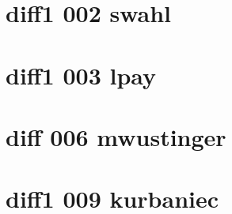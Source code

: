 \documentclass{article}
\begin{document}


\section{diff1 002 swahl}


\section{diff1 003 lpay}




\section{diff 006 mwustinger}




\section{diff1 009 kurbaniec}



\end{document}
